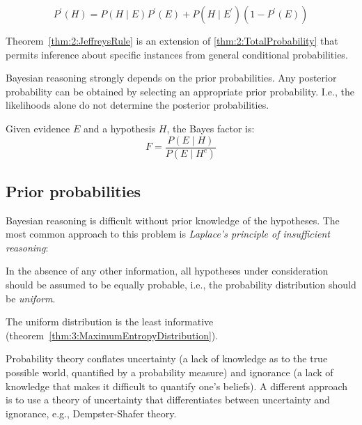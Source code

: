 \begin{thm}
  \label{thm:2:JeffreysRule}
  \begin{equation}\label{eqn:2:JeffreysRule}
    P^\prime(H) = P(H \mid E) P^\prime(E) + P(H \mid E^\prime) (1 - P^\prime(E))
  \end{equation}
\end{thm}

Theorem~\ref{thm:2:JeffreysRule} is an extension of \ref{thm:2:TotalProbability} that permits inference about specific instances from general conditional probabilities.

Bayesian reasoning strongly depends on the prior probabilities.
Any posterior probability can be obtained by selecting an appropriate prior probability.
I.e., the likelihoods alone do not determine the posterior probabilities.

\begin{dfn}
  \label{def:2:BayesFactor}

  Given evidence $E$ and a hypothesis $H$, the Bayes factor is:
  \begin{equation}\label{eqn:2:BayesFactor}
    F = \frac{P(E \mid H)}{P(E \mid H^c)}
  \end{equation}
\end{dfn}

\subsection{Prior probabilities}

Bayesian reasoning is difficult without prior knowledge of the hypotheses.
The most common approach to this problem is \textit{Laplace's principle of insufficient reasoning}:
\begin{displayquote}
  In the absence of any other information, all hypotheses under consideration should be assumed to be equally probable, i.e., the probability distribution should be \textit{uniform}.
\end{displayquote}
The uniform distribution is the least informative (theorem~\ref{thm:3:MaximumEntropyDistribution}).

Probability theory conflates uncertainty (a lack of knowledge as to the true possible world, quantified by a probability measure) and ignorance (a lack of knowledge that makes it difficult to quantify one's beliefs).
A different approach is to use a theory of uncertainty that differentiates between uncertainty and ignorance, e.g., Dempster-Shafer theory.
